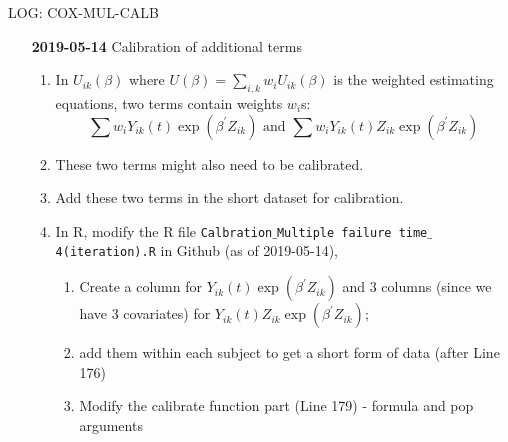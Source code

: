 \documentclass[12pt]{article}
\begin{document}
\begin{center}
{\Large LOG: COX-MUL-CALB}


\end{center}

\begin{itemize}
	\item[{\bf 2019-05-14}] Calibration of additional terms

	\begin{enumerate} 
		 \item In $U_{ik}(\beta)$ where $U(\beta) = \sum_{i,k}w_i U_{ik}(\beta)$ is the weighted estimating equations, 
		 two terms contain weights $w_i$s:
		 \[
		 	\sum w_iY_{ik}(t)\exp(\beta^{\prime} Z_{ik}) \mbox{ and } \sum w_iY_{ik}(t)Z_{ik}\exp(\beta^{\prime} Z_{ik})
		 \] 
		 
		 \item These two terms might also need to be calibrated.
		 
		 \item Add these two terms in the short dataset for calibration.
		 
		 \item In R, modify the R file \texttt{Calbration}$\_$\texttt{Multiple }\texttt{failure }\texttt{time}$\_$\texttt{4(iteration).R} in Github (as of 2019-05-14),
		 \begin{enumerate}
		 	\item Create a column for $Y_{ik}(t)\exp(\beta^{\prime} Z_{ik})$ and 3 columns (since we have 3 covariates) for $Y_{ik}(t)Z_{ik}\exp(\beta^{\prime} Z_{ik})$;
		 	
		 	\item add them within each subject to get a short form of data (after Line 176)
		 	
		 	\item Modify the calibrate function part (Line 179) - formula and pop arguments
		 \end{enumerate}
		 
	\end{enumerate}
\end{itemize}	
\end{document}
